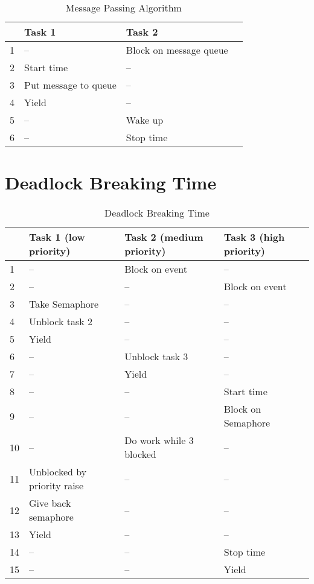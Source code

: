 \begin{table}[htbp]
	\centering
		\begin{tabular}{|l|l|l|l|}
			\hline
				& Task 1 							 & Task 2 								\\
				\hline 
				1 & --									 & Block on message queue	\\
			  2 & Start time		 			 & --											\\
			  3 & Put message to queue & --											\\
			  4 & Yield								 & --											\\
			  5 & --									 & Wake up								\\
			  6 & --									 & Stop time							\\	  
			\hline
		\end{tabular}
	\caption{Message Passing Algorithm}
	\label{tab_message_passing}
\end{table}

\section{Deadlock Breaking Time}
\begin{table}[htbp]
	\centering
		\begin{tabular}{|l|l|l|l|}
			\hline
				& Task 1 (low priority)						& Task 2 (medium priority)	&  Task 3 (high priority)	\\
				\hline 
				1 & --															& Block on event						& --									\\
			  2 & --															& --												& Block on event			\\
			  3 & Take Semaphore 									& --												& --									\\
			  4 & Unblock task  2									& --							 					& --									\\
			  5 & Yield														& --												& --									\\
			  6 & --															&	Unblock task 3						& --									\\
			  7 & --															& Yield											& --									\\
			  8 & --															&	--												& Start time					\\  
			  9 & --															&	--												& Block on Semaphore	\\  	
			  10 & --															& Do work while 3 blocked		& --									\\	
			  11 & Unblocked by priority raise		&	--												& --									\\
			  12 & Give back semaphore						&	--												& --									\\	
			  13 & Yield													& --	  										& --									\\
			  14 & --															&	--												& Stop time						\\
			  15 & --															&	--												& Yield								\\
			\hline
		\end{tabular}
	\caption{Deadlock Breaking Time}
	\label{tab_deadlock}
\end{table}

